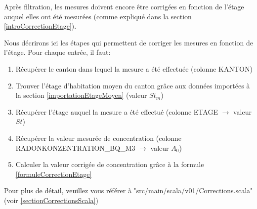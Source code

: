 Après filtration, les mesures doivent encore être corrigées en fonction de l'étage auquel elles ont été mesurées (comme expliqué dans la section \ref{introCorrectionEtage}).

Nous décrirons ici les étapes qui permettent de corriger les mesures en fonction de l'étage.
Pour chaque entrée, il faut:
\begin{enumerate}
\item Récupérer le canton dans lequel la mesure a été effectuée (colonne KANTON)
\item Trouver l'étage d'habitation moyen du canton grâce aux données importées à la section \ref{importationEtageMoyen} (valeur $St_m$)
\item Récupérer l'étage auquel la mesure a été effectué (colonne ETAGE $\rightarrow$ valeur $St$)
\item Récupérer la valeur mesurée de concentration (colonne RADONKONZENTRATION\_BQ\_M3 $\rightarrow$ valeur $A_0$)
\item Calculer la valeur corrigée de concentration grâce à la formule \ref{formuleCorrectionEtage}
\end{enumerate}

Pour plus de détail, veuillez vous référer à "src/main/scala/v01/Corrections.scala" (voir \ref{sectionCorrectionsScala})